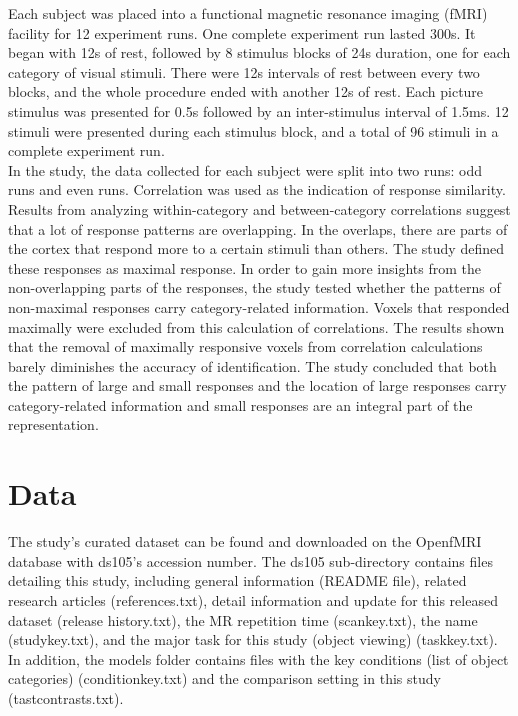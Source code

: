 \documentclass[11pt,twocolumn]{article}
\begin{document}
Each subject was placed into a functional magnetic resonance imaging 
(fMRI) facility for 12 experiment runs. One complete experiment run lasted 
300s. It began with 12s of rest, followed by 8 stimulus blocks of 24s duration, 
one for each category of visual stimuli. There were 12s intervals of 
rest between every two blocks, and the whole procedure ended 
with another 12s of rest. Each picture stimulus was presented
for 0.5s followed by an inter-stimulus interval of 1.5ms. 
12 stimuli were presented during each stimulus 
block, and a total of 96 stimuli in a complete experiment run.\\

In the study, the data collected for each subject were split into two 
runs: odd runs and even runs. Correlation was used as the indication of 
response similarity. Results from analyzing within-category and 
between-category correlations suggest that a lot of response patterns 
are overlapping. In the overlaps, there are parts of the cortex that respond 
more to a certain stimuli than others. The study defined these responses as 
maximal response. In order to gain more insights from the non-overlapping 
parts of the responses, the study tested whether the patterns of non-maximal 
responses carry category-related information. Voxels that responded maximally 
were excluded from this calculation of correlations. The results shown
that the removal of maximally responsive voxels from correlation calculations 
barely diminishes the accuracy of identification. The study concluded 
that both the pattern of large and small responses and the location 
of large responses carry category-related information and small responses
are an integral part of the representation.\\

\section{Data}

The study's curated dataset can be found and downloaded on the OpenfMRI 
database with ds105's accession number. The ds105 
sub-directory contains files detailing this study, including general 
information (README file), related research articles (references.txt), detail 
information and update for this released dataset (release\textunderscore 
history.txt), the MR repetition time (scan\textunderscore key.txt), the name 
(study\textunderscore key.txt), and the major task for this study 
(object viewing) (task\textunderscore key.txt). In addition, the models folder 
contains files with the key conditions (list of object categories) 
(condition\textunderscore key.txt) and the comparison setting in this study 
(tast\textunderscore contrasts.txt). \\
\end{document}
